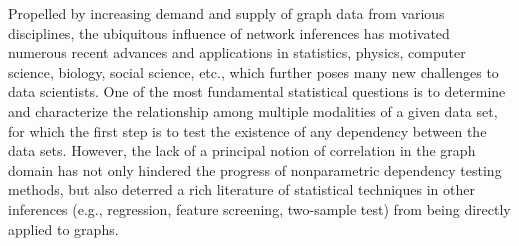 \documentclass[11pt]{article}
\theoremstyle{definition}
\begin{document}
	Propelled by increasing demand and supply of graph data from various disciplines, the ubiquitous influence of network inferences has motivated numerous recent advances and applications in statistics, physics, computer science, biology, social science, etc., which further poses many new challenges to data scientists. One of the most fundamental statistical questions is to determine and characterize the relationship among multiple modalities of a given data set, for which the first step is to test the existence of any dependency between the data sets. However, the lack of a principal notion of correlation in the graph domain has not only hindered the progress of nonparametric dependency testing methods, but also deterred a rich literature of statistical techniques in other inferences (e.g., regression, feature screening, two-sample test) from being directly applied to graphs.
	
\end{document}
